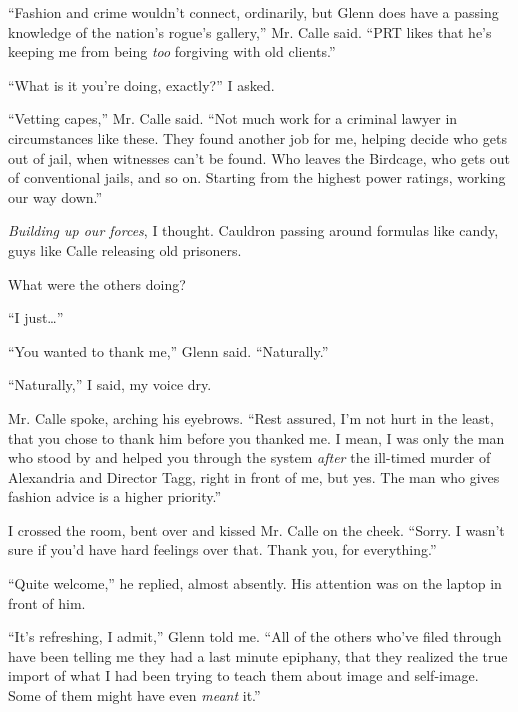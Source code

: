 ``Fashion and crime wouldn't connect, ordinarily, but Glenn does have a passing knowledge of the nation's rogue's gallery,'' Mr. Calle said.  ``PRT likes that he's keeping me from being \emph{too} forgiving with old clients.''



``What is it you're doing, exactly?''  I asked.



``Vetting capes,'' Mr. Calle said.  ``Not much work for a criminal lawyer in circumstances like these.  They found another job for me, helping decide who gets out of jail, when witnesses can't be found.  Who leaves the Birdcage, who gets out of conventional jails, and so on.  Starting from the highest power ratings, working our way down.''



\emph{Building up our forces}, I thought.  Cauldron passing around formulas like candy, guys like Calle releasing old prisoners.



What were the others doing?



``I just\ldots''



``You wanted to thank me,'' Glenn said.  ``Naturally.''



``Naturally,'' I said, my voice dry.



Mr. Calle spoke, arching his eyebrows.  ``Rest assured, I'm not hurt in the least, that you chose to thank him before you thanked me.  I mean, I was only the man who stood by and helped you through the system \emph{after} the ill-timed murder of Alexandria and Director Tagg, right in front of me, but yes.  The man who gives fashion  advice is a higher priority.''



I crossed the room, bent over and kissed Mr. Calle on the cheek.  ``Sorry.  I wasn't sure if you'd have hard feelings over that.  Thank you, for everything.''



``Quite welcome,'' he replied, almost absently.  His attention was on the laptop in front of him.



``It's refreshing, I admit,'' Glenn told me.  ``All of the others who've filed through have been telling me they had a last minute epiphany, that they realized the true import of what I had been trying to teach them about image and self-image.  Some of them might have even \emph{meant} it.''




